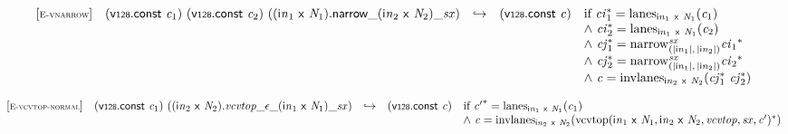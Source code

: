 \vspace{1ex}

$$
\begin{array}{@{}l@{}lcl@{}l@{}}
{[\textsc{\scriptsize E{-}vnarrow}]} \quad & (\mathsf{v{\scriptstyle128}}.\mathsf{const}~{\mathit{c}}_{{1}})~(\mathsf{v{\scriptstyle128}}.\mathsf{const}~{\mathit{c}}_{{2}})~({{{{({{\mathsf{i}}{{\mathit{n}}}}_{{1}}~\mathsf{x}~{\mathit{N}}_{{1}}).\mathsf{narrow}}{\mathsf{\_}}}{({{\mathsf{i}}{{\mathit{n}}}}_{{2}}~\mathsf{x}~{\mathit{N}}_{{2}})}}{\mathsf{\_}}}{{\mathit{sx}}}) &\hookrightarrow& (\mathsf{v{\scriptstyle128}}.\mathsf{const}~{\mathit{c}}) &\quad
  \mbox{if}~{{\mathit{ci}}_{{1}}^\ast} = {{\mathrm{lanes}}}_{{{\mathsf{i}}{{\mathit{n}}}}_{{1}}~\mathsf{x}~{\mathit{N}}_{{1}}}({\mathit{c}}_{{1}}) \\
 &&&&\quad {\land}~{{\mathit{ci}}_{{2}}^\ast} = {{\mathrm{lanes}}}_{{{\mathsf{i}}{{\mathit{n}}}}_{{1}}~\mathsf{x}~{\mathit{N}}_{{1}}}({\mathit{c}}_{{2}}) \\
 &&&&\quad {\land}~{{\mathit{cj}}_{{1}}^\ast} = {{{{{\mathrm{narrow}}}_{({|{{\mathsf{i}}{{\mathit{n}}}}_{{1}}|},\, {|{{\mathsf{i}}{{\mathit{n}}}}_{{2}}|})}^{{\mathit{sx}}}}}{{\mathit{ci}}_{{1}}}^\ast} \\
 &&&&\quad {\land}~{{\mathit{cj}}_{{2}}^\ast} = {{{{{\mathrm{narrow}}}_{({|{{\mathsf{i}}{{\mathit{n}}}}_{{1}}|},\, {|{{\mathsf{i}}{{\mathit{n}}}}_{{2}}|})}^{{\mathit{sx}}}}}{{\mathit{ci}}_{{2}}}^\ast} \\
 &&&&\quad {\land}~{\mathit{c}} = {{\mathrm{invlanes}}}_{{{\mathsf{i}}{{\mathit{n}}}}_{{2}}~\mathsf{x}~{\mathit{N}}_{{2}}}({{\mathit{cj}}_{{1}}^\ast}~{{\mathit{cj}}_{{2}}^\ast}) \\
\end{array}
$$

\vspace{1ex}

$$
\begin{array}{@{}l@{}lcl@{}l@{}}
{[\textsc{\scriptsize E{-}vcvtop{-}normal}]} \quad & (\mathsf{v{\scriptstyle128}}.\mathsf{const}~{\mathit{c}}_{{1}})~(({{\mathsf{i}}{{\mathit{n}}}}_{{2}}~\mathsf{x}~{\mathit{N}}_{{2}}) . {{{{{{{\mathit{vcvtop}}}{\mathsf{\_}}}{\epsilon}}{\mathsf{\_}}}{({{\mathsf{i}}{{\mathit{n}}}}_{{1}}~\mathsf{x}~{\mathit{N}}_{{1}})}}{\mathsf{\_}}}{{\mathit{sx}}}) &\hookrightarrow& (\mathsf{v{\scriptstyle128}}.\mathsf{const}~{\mathit{c}}) &\quad
  \mbox{if}~{{\mathit{c}'}^\ast} = {{\mathrm{lanes}}}_{{{\mathsf{i}}{{\mathit{n}}}}_{{1}}~\mathsf{x}~{\mathit{N}}_{{1}}}({\mathit{c}}_{{1}}) \\
 &&&&\quad {\land}~{\mathit{c}} = {{\mathrm{invlanes}}}_{{{\mathsf{i}}{{\mathit{n}}}}_{{2}}~\mathsf{x}~{\mathit{N}}_{{2}}}({{\mathrm{vcvtop}}({{\mathsf{i}}{{\mathit{n}}}}_{{1}}~\mathsf{x}~{\mathit{N}}_{{1}}, {{\mathsf{i}}{{\mathit{n}}}}_{{2}}~\mathsf{x}~{\mathit{N}}_{{2}}, {\mathit{vcvtop}}, {\mathit{sx}}, {\mathit{c}'})^\ast}) \\
\end{array}
$$

